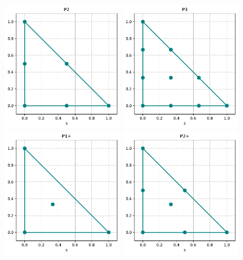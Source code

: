 \begin{center}
\includegraphics[width=5cm]{python_codes/fieldstone_120/spaces/P2_nodes}
\includegraphics[width=5cm]{python_codes/fieldstone_120/spaces/P3_nodes}\\
\includegraphics[width=5cm]{python_codes/fieldstone_120/spaces/P1+_nodes}
\includegraphics[width=5cm]{python_codes/fieldstone_120/spaces/P2+_nodes}
\end{center}

